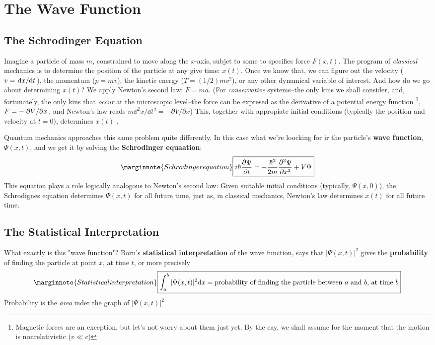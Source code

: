 \chapter{The Wave Function}\label{cap:1}
\section{The Schrodinger Equation}
Imagine a particle of mass $m$, constrained to move along the $x$-axis, subjet to some to specifies force $F(x,t)$. The program of \textit{classical} mechanics is to determine the position of the particle at any give time: $x(t)$. Once we know that, we can figure out the velocity ($v=\dv*{x}{t}$), the momentum ($p=mv$), the kinetic energy ($T=(1/2)mv^2$), or any other dynamical variable of interest. And how do we go about determining $x(t)$? We apply Newton's second law: $F=ma$. (For \textit{conservative} systems--the only kins we shall consider, and, fortunately, the only kins that \textit{occur} at the microscopic level--the force can be expresed as the derivative of a potential energy function \footnote{Magnetic forces are an exception, but let's not worry about them just yet. By the eay, we shall assume for the moment that the motion is nonrelativistic ($v\ll c$)}, $F=-\pdv*{V}{x}$, and Newton's law reads $m\dd ^2x/\dd t^2=-\partial V/\partial x$) This, together with appropiate initial conditions (typically the position and velocity at $t=0$), determines $x(t)$ .

Quantum mechanics approaches this same problem quite differently. In this case what we're loocking for ir the particle's \textbf{wave function}, $\Psi(x,t)$, and we get it by solving the \textbf{Schrodinger equaation}:
\begin{equation}\label{1.1}\marginnote{Schrodinger equation}
	\boxed{i\hbar\pdv{\Psi}{t}=-\frac{\hbar^2}{2m}\pdv[2]{\Psi}{x}+V\Psi}
\end{equation}
This equation plays a role logically analogous to Newton's second law: Given suitable initial conditions (typically, $\Psi(x,0)$), the Schrodignes equation determines $\Psi(x,t)$ for all future time, just as, in classical mechanics, Newton's law determines $x(t)$ for all future time.

\section{The Statistical Interpretation}
What exactly is this "wave function"? Born's \textbf{statistical interpretation} of the wave function, says that $|\Psi(x,t)|^2 $ gives the \textbf{probability} of finding the particle at point $x$, at time $t$, or more precisely
\begin{equation}\label{1.3}\marginnote{Statistical interpretation}
	\boxed{\int_a^b|\Psi(x,t)|^2\dd x=\mbox{probability of finding the particle  between $a$ and $b$, at time $b$}}
\end{equation}
Probability is the \textit{area} inder the graph of $|\Psi(x,t)|^2$

